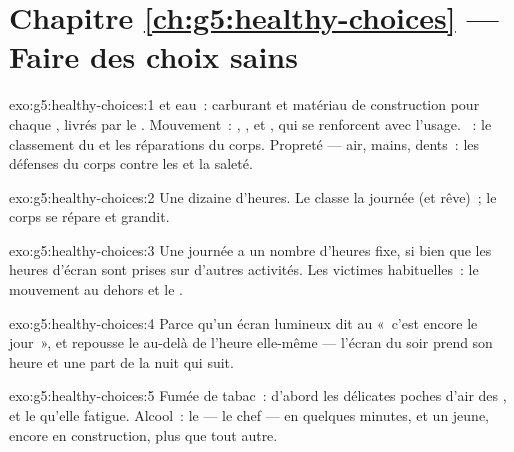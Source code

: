 \section*{Chapitre \ref{ch:g5:healthy-choices} --- Faire des choix sains}

\begin{solution}{exo:g5:healthy-choices:1}
 et eau~: carburant et matériau de construction
pour chaque , livrés par le . Mouvement~: , ,
 et , qui se renforcent avec l'usage. ~: le
classement du  et les réparations du corps. Propreté --- air,
mains, dents~: les défenses du corps contre les  et la
saleté.
\end{solution}

\begin{solution}{exo:g5:healthy-choices:2}
Une dizaine d'heures. Le  classe la journée (et rêve)~; le
corps se répare et grandit.
\end{solution}

\begin{solution}{exo:g5:healthy-choices:3}
Une journée a un nombre d'heures fixe, si bien que les heures
d'écran sont prises sur d'autres activités. Les victimes
habituelles~: le mouvement au dehors et le .
\end{solution}

\begin{solution}{exo:g5:healthy-choices:4}
Parce qu'un écran lumineux dit au  «~c'est encore le jour~»,
et repousse le  au-delà de l'heure elle-même --- l'écran du
soir prend son heure et une part de la nuit qui suit.
\end{solution}

\begin{solution}{exo:g5:healthy-choices:5}
Fumée de tabac~: d'abord les délicates poches d'air des , et
le  qu'elle fatigue. Alcool~: le  --- le chef --- en
quelques minutes, et un  jeune, encore en construction, plus
que tout autre.
\end{solution}

